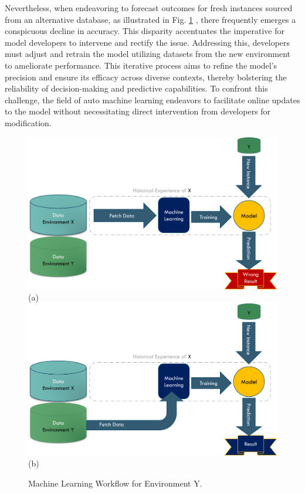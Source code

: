Nevertheless, when endeavoring to forecast outcomes for fresh instances sourced from an alternative database, as illustrated in Fig. \ref{fig:machine-new-senario}
, there frequently emerges a conspicuous decline in accuracy. This disparity accentuates the imperative for model developers to intervene and rectify the issue. Addressing this, developers must adjust and retrain the model utilizing datasets from the new environment to ameliorate performance. This iterative process aims to refine the model's precision and ensure its efficacy across diverse contexts, thereby bolstering the reliability of decision-making and predictive capabilities. To confront this challenge, the field of auto machine learning endeavors to facilitate online updates to the model without necessitating direct intervention from developers for modification.

\begin{figure}[!ht]
    \centering
    \includegraphics[width=.8\textwidth]{1_introduction/figures/PNG/wrong_machine_flow_1.png}\\
    (a) \\
    \includegraphics[width=.8\textwidth]{1_introduction/figures/PNG/wrong_machine_flow_2.png}\\
    (b)
    \caption{Machine Learning Workflow for Environment Y.}
    \label{fig:machine-new-senario}
\end{figure}



